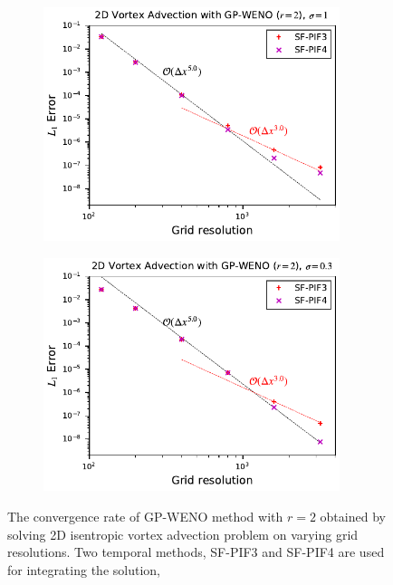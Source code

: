 \begin{figure}
    \centering
    \begin{subfigure}{70mm}
        \centering
        \includegraphics[width=0.95\textwidth]{fig/gp2_vortex_error_sigma1}
    \end{subfigure}
    \begin{subfigure}{70mm}
        \centering
        \includegraphics[width=0.95\textwidth]{fig/gp2_vortex_error_sigma03}
    \end{subfigure}
    \caption{The convergence rate of GP-WENO method with \( r=2 \) obtained by solving
        2D isentropic vortex advection problem on varying grid resolutions.
        Two temporal methods, SF-PIF3 and SF-PIF4 are used for integrating the solution,
}
\end{figure}

